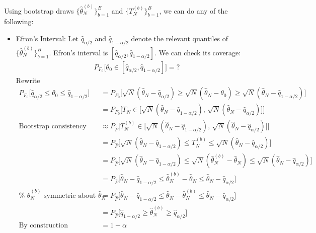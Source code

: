 \documentclass[12pt]{article}
\theoremstyle{plain}
\theoremstyle{definition}
\theoremstyle{remark}
\begin{document}
\clearpage
Using bootstrap draws
$\{\hat{\theta}_N^{(b)}\}_{b=1}^B$ and
$\{T_N^{(b)}\}_{b=1}^B$, we can do any of the following:
\begin{itemize}
  \item
    Efron's Interval:
    Let $\hat{q}_{\alpha/2}$ and $\hat{q}_{1-\alpha/2}$ denote the
    relevant quantiles of $\{\hat{\theta}_N^{(b)}\}_{b=1}^B$.
    Efron's interval is $[\hat{q}_{\alpha/2},\hat{q}_{1-\alpha/2}]$.
    We can check its coverage:
    \begin{align*}
      P_{F_0}
      \bigg[
        \theta_0
        \in [\hat{q}_{\alpha/2},\hat{q}_{1-\alpha/2}]
      \bigg]
      = ?
    \end{align*}
    Rewrite
    \begin{align*}
      P_{F_0}
      \bigg[
        \hat{q}_{\alpha/2}
        \leq
        \theta_0
        \leq
        \hat{q}_{1-\alpha/2}
      \bigg]
      &=
      P_{F_0}
      \bigg[
        \sqrt{N}(\hat{\theta}_N-\hat{q}_{\alpha/2})
        \geq
        \sqrt{N}(\hat{\theta}_N-\theta_0)
        \geq
        \sqrt{N}(\hat{\theta}_N-\hat{q}_{1-\alpha/2})
      \bigg]
      \\
      &=
      P_{F_0}
      \bigg[
        T_N
        \in
        \big[
        \sqrt{N}(\hat{\theta}_N-\hat{q}_{1-\alpha/2})
        ,\,
        \sqrt{N}(\hat{\theta}_N-\hat{q}_{\alpha/2})
        \big]
      \bigg]
      \\
      \text{Bootstrap consistency}
      \quad
      &\approx
      P_{\hat{F}}
      \bigg[
        T_N^{(b)}
        \in
        \big[
        \sqrt{N}(\hat{\theta}_N-\hat{q}_{1-\alpha/2})
        ,\,
        \sqrt{N}(\hat{\theta}_N-\hat{q}_{\alpha/2})
        \big]
      \bigg]
      \\
      &=
      P_{\hat{F}}
      \bigg[
        \sqrt{N}(\hat{\theta}_N-\hat{q}_{1-\alpha/2})
        \leq
        T_N^{(b)}
        \leq
        \sqrt{N}(\hat{\theta}_N-\hat{q}_{\alpha/2})
      \bigg]
      \\
      &=
      P_{\hat{F}}
      \bigg[
        \sqrt{N}(\hat{\theta}_N-\hat{q}_{1-\alpha/2})
        \leq
        \sqrt{N}(\hat{\theta}_N^{(b)}-\hat{\theta}_N)
        \leq
        \sqrt{N}(\hat{\theta}_N-\hat{q}_{\alpha/2})
      \bigg]
      \\
      &=
      P_{\hat{F}}
      \bigg[
        \hat{\theta}_N-\hat{q}_{1-\alpha/2}
        \leq
        \hat{\theta}_N^{(b)}-\hat{\theta}_N
        \leq
        \hat{\theta}_N-\hat{q}_{\alpha/2}
      \bigg]
      \\
      \text{%
        $\hat{\theta}^{(b)}_N$ symmetric about $\hat{\theta}_N$
      }
      \quad
      &=
      P_{\hat{F}}
      \bigg[
        \hat{\theta}_N-\hat{q}_{1-\alpha/2}
        \leq
        \hat{\theta}_N
        -
        \hat{\theta}_N^{(b)}
        \leq
        \hat{\theta}_N-\hat{q}_{\alpha/2}
      \bigg]
      \\
      &=
      P_{\hat{F}}
      \bigg[
        \hat{q}_{1-\alpha/2}
        \geq
        \hat{\theta}_N^{(b)}
        \geq
        \hat{q}_{\alpha/2}
      \bigg]
      \\
      \text{By construction}\quad
      &=
      1-\alpha
    \end{align*}




\end{itemize}
\end{document}
